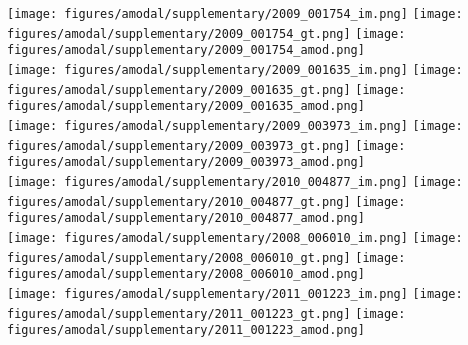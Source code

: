 \begin{figure*}
\centering\texttt{[image: figures/amodal/supplementary/2009\_001754\_im.png]}
\texttt{[image: figures/amodal/supplementary/2009\_001754\_gt.png]}
\texttt{[image: figures/amodal/supplementary/2009\_001754\_amod.png]} \\ 
\texttt{[image: figures/amodal/supplementary/2009\_001635\_im.png]}
\texttt{[image: figures/amodal/supplementary/2009\_001635\_gt.png]}
\texttt{[image: figures/amodal/supplementary/2009\_001635\_amod.png]} \\ 
\texttt{[image: figures/amodal/supplementary/2009\_003973\_im.png]}
\texttt{[image: figures/amodal/supplementary/2009\_003973\_gt.png]}
\texttt{[image: figures/amodal/supplementary/2009\_003973\_amod.png]} \\ 
\texttt{[image: figures/amodal/supplementary/2010\_004877\_im.png]}
\texttt{[image: figures/amodal/supplementary/2010\_004877\_gt.png]}
\texttt{[image: figures/amodal/supplementary/2010\_004877\_amod.png]} \\ 
\texttt{[image: figures/amodal/supplementary/2008\_006010\_im.png]}
\texttt{[image: figures/amodal/supplementary/2008\_006010\_gt.png]}
\texttt{[image: figures/amodal/supplementary/2008\_006010\_amod.png]} \\ 
\texttt{[image: figures/amodal/supplementary/2011\_001223\_im.png]}
\texttt{[image: figures/amodal/supplementary/2011\_001223\_gt.png]}
\texttt{[image: figures/amodal/supplementary/2011\_001223\_amod.png]} \\ 
\end{figure*}
